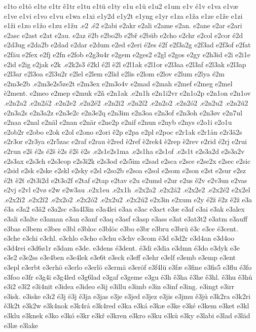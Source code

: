 e1to
e1tö
e1tø
e1tr
ě1tr
e1tu
e1tü
e1ty
e1u
e1ü
e1u2
e1um
e1v
é1v
e1va
e1væ
e1ve
e1vi
e1vo
e1vu
e1wa
e1xi
e1y2d
e1y2t
e1yng
e1yr
e1za
e1ža
e1ze
e1že
e1zi
e1ži
e1zo
e1žo
e1zu
e1žu
.e2
.é2
e2abi
e2akr
e2ali
e2ame
e2an.
e2ane
e2ar
e2ari
e2asc
e2ast
e2at
e2au.
e2az
ë2b
e2bo2b
e2bř
e2büb
e2cho
e2chr
e2col
e2cor
é2d
e2d3ug
e2da2b
e2dad
e2dar
e2dum
e2ed
e2eri
é2es
é2f
e2f3a2g
e2f3ad
e2f3of
e2fat
e2fäu
e2fex
e2fj
e2fn
e2fob
e2g3u4r
e2gem
e2ges2
e2gl
e2gos
e2gy
e2h3id
e2i
e2i1e
e2id
e2ig
e2jak
e2k
.e2k2s3
é2kl
é2l
è2l
e2l1ak
e2l1or
e2l3aa
e2l3af
e2l3ak
e2l3ap
e2l3ar
e2l3oa
e2l3u2r
e2lel
e2lem
e2lid
e2lis
e2lom
e2lov
e2lum
e2lya
é2m
e2m3e2b
.e2m3e2s5ze2t
e2m3ex
e2m3o4v
e2mad
e2mah
e2mef
e2meg
e2mel
è2ment.
e2meo
e2mep
e2muk
e2ň
e2n1ak
.e2n1h
e2n1i2vr
e2n1o2p
e2n1on
e2n1ov
.e2n2a2
.e2n2á2
.e2n2e2
.e2n2é2
.e2n2i2
.e2n2í2
.e2n2o2
.e2n2ó2
.e2n2u2
.e2n2ú2
e2n3a2s
e2n3a2z
e2n3e2c
e2n3e2q
e2n3im
e2n3oa
e2n3of
e2n3oh
e2n3øv
e2n7ul
e2naa
e2nal
e2näl
e2nan
e2när
e2ne2p
e2nif
e2nun
e2nyb
e2nys
e2o1i
e2o1u
e2ob2r
e2obo
e2ok
e2ol
e2ono
e2ori
ê2p
e2pa
e2pl
e2poc
e2r1ak
e2r1ån
e2r3ä2s
e2r3or
e2r3ya
e2r5zac
e2raf
e2rau
è2red
è2ref
è2rek4
è2rep
è2rev
e2rid
é2rj
e2rui
e2run
e2š
é2s
é2š
è2s
ě2š
ë2s
.e2s1e2s1ma
.e2s1ha
e2s1of
.e2s1t
e2s3a2d
e2s3a2v
e2s3ax
e2s3ch
e2s3cop
e2s3i2k
e2s3od
e2s5im
e2sad
e2sca
e2sce
e2se2x
e2sec
e2sic
e2sid
e2sk
e2ske
e2skl
e2sky
e2sl
e2so2b
e2soa
e2sol
e2som
e2son
e2st
e2sur
e2sz
é2t
ě2ť
e2t3i2d
e2t3o2f
e2taf
e2tap
e2tav
e2u
e2umd
e2ur
e2us
ě2v
e2v3un
e2vas
e2vj
e2vl
e2vø
e2w
e2w3au
.e2x1eu
.e2x1h
.e2x2a2
.e2x2á2
.e2x2e2
.e2x2é2
e2x2el
.e2x2i2
.e2x2í2
.e2x2o2
.e2x2ó2
.e2x2u2
.e2x2ú2
e2x3in
e2xum
e2y
é2ž
ě2z
ě2ž
e3a
é3a
e3a2
e3â2
e3a2sc
e3a4l3in
e3a4lei
e3aa
e3ac
e3act
e3æ
e3af
e3ai
e3ak
e3alex
e3ali
e3alte
e3aman
e3an
e3anf
e3aq
e3asf
e3asp
e3ass
e3at
e3at3t2
e3atm
e3auff
e3bas
e3bem
e3bes
e3bl
e3bloc
e3blöc
e3bo
e3br
e3bru
e3brü
ë3c
e3ce
é3cent.
e3che
e3chi
e3chl.
e3chlo
e3cho
e3chu
e3chv
e3com
ë3d
e3d2r
e3d4an
e3d4oo
e3d4rei
e3d6ø1r
e3dam
e3de.
e3dens
é3dent.
é3di
e3dia
e3dmn
é3do
e3dyk
e3e
e3e2
e3e2ss
e3e4ben
e3e4lek
e3e6t
e3eck
e3eff
e3ehr
e3elf
e3emb
e3emp
e3ent
e3epl
e3erbt
e3erhö
e3erlo
e3erlö
e3ermä
e3eröf
e3f4lü
e3fæ
e3fine
e3fis5
e3flu
é3fo
e3foo
e3fr
e3g4i
e3g4led
e3g6lad
e3gaf
e3geme
e3gu
é3h
ě3ha
ě3he
ě3hl.
ě3hu
ě3hů
e3i2
e3î2
e3i4nit
e3idea
e3ideo
e3ij
e3illu
e3imb
e3in
e3inf
e3ing.
e3ingt
e3irr
e3isk.
e3iske
e3ı2
é3j
ë3j
ě3ja
e3jas
e3je
e3jed
e3jez
e3jis
e3jmu
ě3jů
e3k2ra
e3k2ri
ě3k2t
e3k2w
e3k4nok
e3k4rå
e3k4red
e3ka
e3ká
e3kæ
e3ke
e3ké
e3kem
e3ket
e3kl
e3klu
e3knek
e3ko
e3kó
e3kr
e3kř
e3kren
e3kro
e3ku
e3ků
e3ky
e3labi
e3lad
e3läd
e3læ
e3lake
